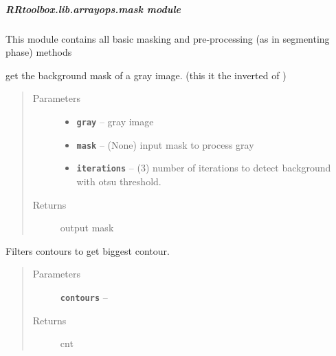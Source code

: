 \documentclass[letterpaper,10pt,english]{sphinxmanual}
\begin{document}
\subparagraph{RRtoolbox.lib.arrayops.mask module}
\label{RRtoolbox.lib.arrayops:module-RRtoolbox.lib.arrayops.mask}\label{RRtoolbox.lib.arrayops:rrtoolbox-lib-arrayops-mask-module}
This module contains all basic masking and pre-processing (as in segmenting phase) methods

\begin{fulllineitems}
\label{RRtoolbox.lib.arrayops:RRtoolbox.lib.arrayops.mask.background}
get the background mask of a gray image. (this it the inverted of {\hyperref[RRtoolbox.lib.arrayops:RRtoolbox.lib.arrayops.mask.foreground]{\emph{}}})
\begin{quote}\begin{description}
\item[{Parameters}] \leavevmode\begin{itemize}
\item {} 
\textbf{\texttt{gray}} -- gray image

\item {} 
\textbf{\texttt{mask}} -- (None) input mask to process gray

\item {} 
\textbf{\texttt{iterations}} -- (3) number of iterations to detect background
with otsu threshold.

\end{itemize}

\item[{Returns}] \leavevmode
output mask

\end{description}\end{quote}

\end{fulllineitems}


\begin{fulllineitems}
\label{RRtoolbox.lib.arrayops:RRtoolbox.lib.arrayops.mask.biggestCnt}
Filters contours to get biggest contour.
\begin{quote}\begin{description}
\item[{Parameters}] \leavevmode
\textbf{\texttt{contours}} -- 

\item[{Returns}] \leavevmode
cnt

\end{description}\end{quote}

\end{fulllineitems}
\end{document}
